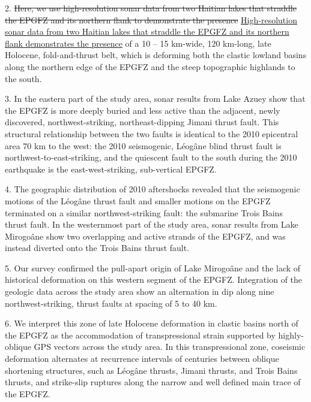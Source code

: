 \documentclass[linenumbers,draft]{agujournal}
\providecommand{\DIFdel}[1]{{\protect\color{red}\sout{#1}}}                      %
\providecommand{\DIFaddbegin}{} %
\providecommand{\DIFaddend}{} %
\providecommand{\DIFdelbegin}{} %
\providecommand{\DIFdelend}{} %
\begin{document}
2. \DIFdelbegin \DIFdel{Here, we use high-resolution sonar data from two Haitian lakes that straddle the EPGFZ and its northern flank to demonstrate the presence }\DIFdelend \DIFaddbegin \ul{High-resolution sonar data from two Haitian lakes that straddle the EPGFZ and its northern flank demonstrates the presence} \DIFaddend of a 10 -- 15 km-wide, 120 km-long, late Holocene, fold-and-thrust belt, which is deforming both the clastic lowland basins along the northern edge of the EPGFZ and the steep topographic highlands to the south. 

3. In the eastern part of the study area, sonar results from Lake Azuey show that the EPGFZ is more deeply buried and less active than the adjacent, newly discovered, northwest-striking, northeast-dipping Jimani thrust fault. This structural relationship between the two faults is identical to the 2010 epicentral area 70 km to the west: the 2010 seismogenic, L\'eog\^ane blind thrust fault is northwest-to-east-striking, and the quiescent fault to the south during the 2010 earthquake is the east-west-striking, sub-vertical EPGFZ. 

4. The geographic distribution of 2010 aftershocks revealed that the seismogenic motions of the L\'eog\^ane thrust fault and smaller motions on the EPGFZ terminated on a similar northwest-striking fault: the submarine Trois Bains thrust fault. In the westernmost part of the study area, sonar results from Lake Mirogo\^ane show two overlapping and active strands of the EPGFZ, and was instead diverted onto the Trois Bains thrust fault.

5. Our survey confirmed the pull-apart origin of Lake Mirogo\^ane and the lack of historical deformation on this western segment of the EPGFZ. Integration of the geologic data across the study area show an alternation in dip along nine northwest-striking, thrust faults at spacing of 5 to 40 km.

6.  We interpret this zone of late Holocene deformation in clastic basins north of the EPGFZ as the accommodation of transpressional strain supported by highly-oblique GPS vectors across the study area. In this transpressional zone, coseismic deformation alternates at recurrence intervals of centuries between oblique shortening structures, such as L\'eog\^ane thrusts, Jimani thrusts, and Trois Bains thrusts, and strike-slip ruptures along the narrow and well defined main trace of the EPGFZ.
\end{document}
